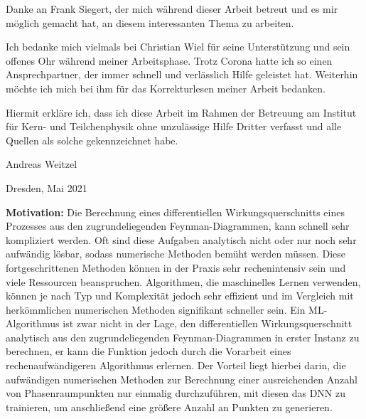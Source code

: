 \clearpage
\pagestyle{empty}
Danke an Frank Siegert, der mich während dieser Arbeit betreut und es mir möglich gemacht hat, an diesem interessanten Thema zu arbeiten. 

Ich bedanke mich vielmals bei Christian Wiel für seine Unterstützung und sein offenes Ohr während meiner Arbeitsphase. Trotz Corona hatte ich so einen Ansprechpartner, der immer schnell und verlässlich Hilfe geleistet hat. Weiterhin möchte ich mich bei ihm für das Korrekturlesen meiner Arbeit bedanken.
\clearpage
\thispagestyle{empty}
\vspace*{1.5em}

Hiermit erkläre ich, dass ich diese Arbeit im Rahmen der Betreuung am Institut
für Kern- und Teilchenphysik ohne unzulässige Hilfe Dritter verfasst und alle Quellen als solche gekennzeichnet habe.

\vspace*{45em}

Andreas Weitzel \par
Dresden, Mai 2021


\textbf{Motivation:}
Die Berechnung eines differentiellen Wirkungsquerschnitts eines Prozesses aus den zugrundeliegenden Feynman-Diagrammen, kann schnell sehr kompliziert werden. Oft sind diese Aufgaben analytisch nicht oder nur noch sehr aufwändig lösbar, sodass numerische Methoden bemüht werden müssen. Diese fortgeschrittenen Methoden können in der Praxis sehr rechenintensiv sein und viele Ressourcen beanspruchen. Algorithmen, die maschinelles Lernen verwenden, können je nach Typ und Komplexität jedoch sehr effizient und im Vergleich mit herkömmlichen numerischen Methoden signifikant schneller sein. Ein ML-Algorithmus ist zwar nicht in der Lage, den differentiellen Wirkungsquerschnitt analytisch aus den zugrundeliegenden Feynman-Diagrammen in erster Instanz zu berechnen, er kann die Funktion jedoch durch die Vorarbeit eines rechenaufwändigeren Algorithmus erlernen. Der Vorteil liegt hierbei darin, die aufwändigen numerischen Methoden zur Berechnung einer ausreichenden Anzahl von Phasenraumpunkten nur einmalig durchzuführen, mit diesen das DNN zu trainieren, um anschließend eine größere Anzahl an Punkten zu generieren.

